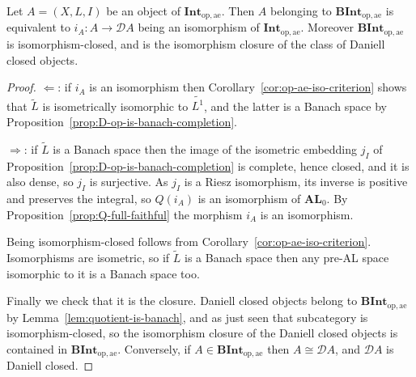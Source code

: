 \begin{proposition}\label{prop:BInt-characterization}
  Let $A=(X,L,I)$ be an object of
  $\mathbf{Int}_{\mathrm{op},\mathrm{ae}}$.
  Then $A$ belonging to $\mathbf{BInt}_{\mathrm{op},\mathrm{ae}}$ is equivalent
  to $i_A:A\to\mathcal{D}A$ being an isomorphism of
  $\mathbf{Int}_{\mathrm{op},\mathrm{ae}}$.
  Moreover $\mathbf{BInt}_{\mathrm{op},\mathrm{ae}}$ is isomorphism-closed, and
  is the isomorphism closure of the class of Daniell closed objects.
\end{proposition}
\begin{proof}
  $\Leftarrow$: if $i_A$ is an isomorphism then
  Corollary~\ref{cor:op-ae-iso-criterion} shows that $\widetilde{L}$ is
  isometrically isomorphic to $\widetilde{L^1}$, and the latter is a Banach
  space by Proposition~\ref{prop:D-op-is-banach-completion}.

  $\Rightarrow$: if $\widetilde{L}$ is a Banach space then the image of the
  isometric embedding $j_I$ of
  Proposition~\ref{prop:D-op-is-banach-completion} is complete, hence closed,
  and it is also dense, so $j_I$ is surjective.
  As $j_I$ is a Riesz isomorphism, its inverse is positive and preserves the
  integral, so $Q(i_A)$ is an isomorphism of $\mathbf{AL}_0$.
  By Proposition~\ref{prop:Q-full-faithful} the morphism $i_A$ is an
  isomorphism.

  Being isomorphism-closed follows from
  Corollary~\ref{cor:op-ae-iso-criterion}.
  Isomorphisms are isometric, so if $\widetilde{L}$ is a Banach space then any
  pre-AL space isomorphic to it is a Banach space too.

  Finally we check that it is the closure.
  Daniell closed objects belong to
  $\mathbf{BInt}_{\mathrm{op},\mathrm{ae}}$ by
  Lemma~\ref{lem:quotient-is-banach}, and as just seen that subcategory is
  isomorphism-closed, so the isomorphism closure of the Daniell closed objects
  is contained in $\mathbf{BInt}_{\mathrm{op},\mathrm{ae}}$.
  Conversely, if $A\in\mathbf{BInt}_{\mathrm{op},\mathrm{ae}}$ then
  $A\cong\mathcal{D}A$, and $\mathcal{D}A$ is Daniell closed.
\end{proof}

